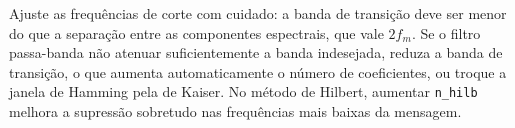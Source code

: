 \documentclass[11pt,a4paper]{article}
\begin{document}
\begin{atencao}
Ajuste as frequências de corte com cuidado: a banda de transição deve ser
menor do que a separação entre as componentes espectrais, que vale $2f_m$.
Se o filtro passa-banda não atenuar suficientemente a banda indesejada,
reduza a banda de transição, o que aumenta automaticamente o número de
coeficientes, ou troque a janela de Hamming pela de Kaiser. No método de
Hilbert, aumentar \texttt{n\_hilb} melhora a supressão sobretudo nas
frequências mais baixas da mensagem.
\end{atencao}
\end{document}

